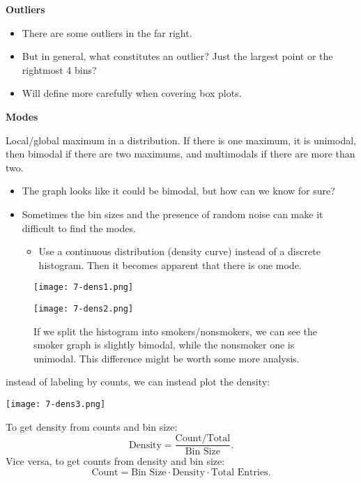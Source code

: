 \textbf{Outliers}
\begin{itemize}
\item There are some outliers in the far right.
\item But in general, what constitutes an outlier? Just the largest point or the rightmost 4 bins?
\item Will define more carefully when covering box plots.
\end{itemize}

\textbf{Modes}
\begin{definition}[Mode]{Local/global maximum in a distribution. If there is one maximum, it is unimodal, then bimodal if there are two maximums, and multimodals if there are more than two. 
}
\end{definition}
\begin{itemize}
\item The graph looks like it could be bimodal, but how can we know for sure?
\item Sometimes the bin sizes and the presence of random noise can make it difficult to find the modes.
\begin{itemize}
\item Use a continuous distribution (density curve) instead of a discrete histogram. Then it becomes apparent that there is one mode.
\end{itemize}
\end{itemize}
\begin{figure}[ht]
\centering
\begin{minipage}{0.5\textwidth}
\centering
\texttt{[image: 7-dens1.png]}
\end{minipage}%
\begin{minipage}{0.5\textwidth}
\centering
\texttt{[image: 7-dens2.png]}
\end{minipage}
\centering\caption{If we split the histogram into smokers/nonsmokers, we can see the smoker graph is slightly bimodal, while the nonsmoker one is unimodal. This difference might be worth some more analysis.}
\end{figure}

\begin{notebox}[]
instead of labeling by counts, we can instead plot the density:
\begin{center}
\texttt{[image: 7-dens3.png]}
\end{center}
To get density from counts and bin size:
\[
\text{Density} = \frac{\text{Count} / \text{Total}}{\text{Bin Size}}
.\] 
Vice versa, to get counts from density and bin size:
\[
    \text{Count} = \text{Bin Size} \cdot \text{Density} \cdot \text{Total Entries}
.\] 
\end{notebox}

